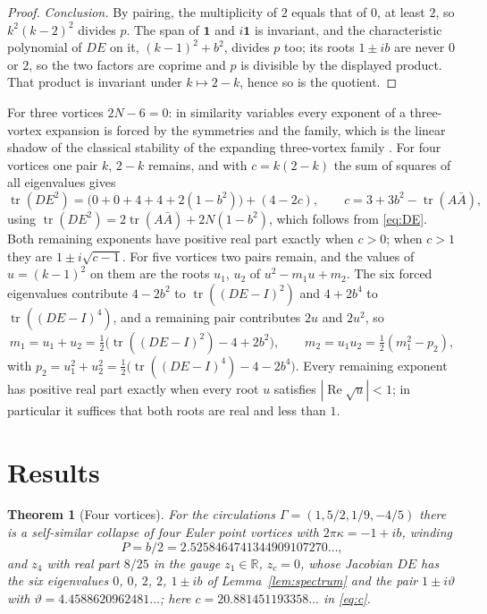 \documentclass[11pt]{article}
\newtheorem{theorem}{Theorem}
\theoremstyle{definition}
\newcommand{\re}{\operatorname{Re}}
\newcommand{\tr}{\operatorname{tr}}
\newcommand{\R}{\mathbb{R}}
\begin{document}
\begin{proof}
\emph{Conclusion.} By pairing, the multiplicity of $2$ equals that of $0$, at least $2$, so $k^2(k - 2)^2$ divides $p$. The span of $\mathbf 1$ and $i\mathbf 1$ is invariant, and the characteristic polynomial of $DE$ on it, $(k - 1)^2 + b^2$, divides $p$ too; its roots $1 \pm ib$ are never $0$ or $2$, so the two factors are coprime and $p$ is divisible by the displayed product. That product is invariant under $k \mapsto 2 - k$, hence so is the quotient.
\end{proof}

For three vortices $2N - 6 = 0$: in similarity variables every exponent of a three-vortex expansion is forced by the symmetries and the family, which is the linear shadow of the classical stability of the expanding three-vortex family \cite{tt1988}. For four vortices one pair $k$, $2 - k$ remains, and with $c = k(2 - k)$ the sum of squares of all eigenvalues gives
\begin{equation}\label{eq:c}
  \tr(DE^2) = \bigl(0 + 0 + 4 + 4 + 2(1 - b^2)\bigr) + (4 - 2c),\qquad c = 3 + 3b^2 - \tr(A\bar A),
\end{equation}
using $\tr(DE^2) = 2\tr(A\bar A) + 2N(1 - b^2)$, which follows from \eqref{eq:DE}. Both remaining exponents have positive real part exactly when $c > 0$; when $c > 1$ they are $1 \pm i\sqrt{c - 1}$. For five vortices two pairs remain, and the values of $u = (k - 1)^2$ on them are the roots $u_1$, $u_2$ of $u^2 - m_1u + m_2$. The six forced eigenvalues contribute $4 - 2b^2$ to $\tr((DE - I)^2)$ and $4 + 2b^4$ to $\tr((DE - I)^4)$, and a remaining pair contributes $2u$ and $2u^2$, so
\begin{equation}\label{eq:m}
  m_1 = u_1 + u_2 = \tfrac12\bigl(\tr((DE - I)^2) - 4 + 2b^2\bigr),\qquad m_2 = u_1u_2 = \tfrac12(m_1^2 - p_2),
\end{equation}
with $p_2 = u_1^2 + u_2^2 = \frac12\bigl(\tr((DE - I)^4) - 4 - 2b^4\bigr)$. Every remaining exponent has positive real part exactly when every root $u$ satisfies $|\re\sqrt{u}| < 1$; in particular it suffices that both roots are real and less than $1$.

\section{Results}\label{sec:results}

\begin{theorem}[Four vortices]\label{thm:four}
For the circulations $\Gamma = (1, 5/2, 1/9, -4/5)$ there is a self-similar collapse of four Euler point vortices with $2\pi\kappa = -1 + ib$, winding
\[
  P = b/2 = 2.5258464741344909107270\ldots,
\]
and $z_4$ with real part $8/25$ in the gauge $z_1 \in \R$, $z_c = 0$, whose Jacobian $DE$ has the six eigenvalues $0$, $0$, $2$, $2$, $1 \pm ib$ of Lemma~\ref{lem:spectrum} and the pair $1 \pm i\vartheta$ with $\vartheta = 4.4588620962481\ldots$; here $c = 20.881451193358\ldots$ in \eqref{eq:c}.
\end{theorem}
\end{document}
